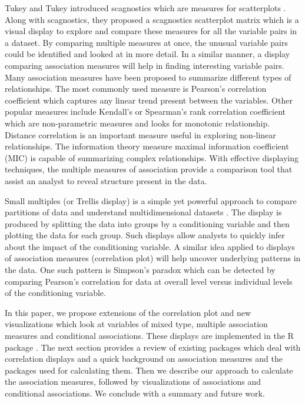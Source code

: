 Tukey and Tukey introduced scagnostics which are measures for
scatterplots \citep{tukey1985computer}. Along with scagnostics, they
proposed a scagnostics scatterplot matrix which is a visual display to
explore and compare these measures for all the variable pairs in a
dataset. By comparing multiple measures at once, the unusual variable
pairs could be identified and looked at in more detail. In a similar
manner, a display comparing association measures will help in finding
interesting variable pairs. Many association measures have been proposed
to summarize different types of relationships. The most commonly used
measure is Pearson's correlation coefficient which captures any linear
trend present between the variables. Other popular measures include
Kendall's or Spearman's rank correlation coefficient which are
non-parametric measures and looks for monotonic relationship. Distance
correlation \citep{szekely2007measuring} is an important measure useful
in exploring non-linear relationships. The information theory measure
maximal information coefficient (MIC) \citep{reshef2011detecting} is
capable of summarizing complex relationships. With effective displaying
techniques, the multiple measures of association provide a comparison
tool that assist an analyst to reveal structure present in the data.

Small multiples (or Trellis display) is a simple yet powerful approach
to compare partitions of data and understand multidimensional datasets
\citep{tufte1986thevisual}. The display is produced by splitting the
data into groups by a conditioning variable and then plotting the data
for each group. Such displays allow analysts to quickly infer about the
impact of the conditioning variable. A similar idea applied to displays
of association measures (correlation plot) will help uncover underlying
patterns in the data. One such pattern is Simpson's paradox which can be
detected by comparing Pearson's correlation for data at overall level
versus individual levels of the conditioning variable.

In this paper, we propose extensions of the correlation plot and new
visualizations which look at variables of mixed type, multiple
association measures and conditional associations. These displays are
implemented in the R package . The next section provides
a review of existing packages which deal with correlation displays and a
quick background on association measures and the packages used for
calculating them. Then we describe our approach to calculate the
association measures, followed by visualizations of associations and
conditional associations. We conclude with a summary and future work.

